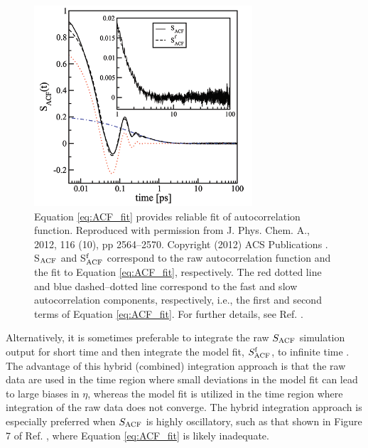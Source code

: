 \documentclass[9pt,bestpractices]{livecoms}
\begin{document}
\begin{figure}[htb!]
	\centering
	\includegraphics[width=3.2in]{FanourgakisFig1.png}
	\caption{Equation \ref{eq:ACF_fit} provides reliable fit of autocorrelation function. Reproduced with permission from J. Phys. Chem. A., 2012, 116 (10), pp 2564--2570. Copyright (2012) ACS Publications \cite{Fanourgakis2012}. S$_{\rm ACF}$ and S$^{\rm f}_{\rm ACF}$ correspond to the raw autocorrelation function and the fit to Equation \ref{eq:ACF_fit}, respectively. The red dotted line and blue dashed--dotted line correspond to the fast and slow autocorrelation components, respectively, i.e., the first and second terms of Equation \ref{eq:ACF_fit}. For further details, see Ref. \cite{Fanourgakis2012}.}
	\label{fig:FanourgakisFig1}
\end{figure}


Alternatively, it is sometimes preferable to integrate the raw $S_{\rm ACF}$ simulation output for short time and then integrate the model fit, $S^{\rm f}_{\rm ACF}$, to infinite time \cite{vanderSpoel1998,Shirts2013,Fernandez2005}. The advantage of this hybrid (combined) integration approach is that the raw data are used in the time region where small deviations in the model fit can lead to large biases in $\eta$, whereas the model fit is utilized in the time region where integration of the raw data does not converge. The hybrid integration approach is especially preferred when $S_{\rm ACF}$ is highly oscillatory, such as that shown in Figure 7 of Ref. \cite{Fernandez2005}, where Equation \ref{eq:ACF_fit} is likely inadequate. 
\end{document}
